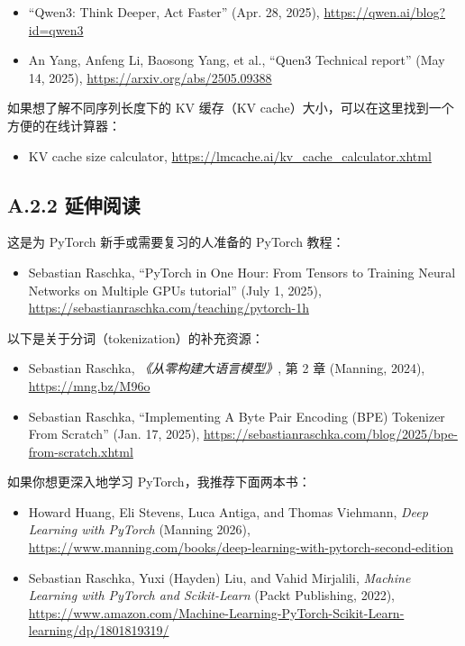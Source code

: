 \begin{itemize}
\item “Qwen3: Think Deeper, Act Faster” (Apr. 28, 2025), \href{https://qwen.ai/blog?id=qwen3}{https://qwen.ai/blog?id=qwen3}
\item An Yang, Anfeng Li, Baosong Yang, et al., “Quen3 Technical report” (May 14, 2025), \href{https://arxiv.org/abs/2505.09388}{https://arxiv.org/abs/2505.09388}
\end{itemize}

如果想了解不同序列长度下的 KV 缓存（KV cache）大小，可以在这里找到一个方便的在线计算器：

\begin{itemize}
\item KV cache size calculator, \href{https://lmcache.ai/kv\_cache\_calculator.xhtml}{https://lmcache.ai/kv\_cache\_calculator.xhtml}
\end{itemize}

\subsection{A.2.2 延伸阅读}

这是为 PyTorch 新手或需要复习的人准备的 PyTorch 教程：

\begin{itemize}
\item Sebastian Raschka, “PyTorch in One Hour: From Tensors to Training Neural Networks on Multiple GPUs tutorial” (July 1, 2025), \href{https://sebastianraschka.com/teaching/pytorch-1h}{https://sebastianraschka.com/teaching/pytorch-1h}
\end{itemize}

以下是关于分词（tokenization）的补充资源：

\begin{itemize}
\item Sebastian Raschka, \emph{《从零构建大语言模型》}, 第 2 章 (Manning, 2024), \href{https://mng.bz/M96o}{https://mng.bz/M96o}
\item Sebastian Raschka, “Implementing A Byte Pair Encoding (BPE) Tokenizer From Scratch” (Jan. 17, 2025), \href{https://sebastianraschka.com/blog/2025/bpe-from-scratch.xhtml}{https://sebastianraschka.com/blog/2025/bpe-from-scratch.xhtml}
\end{itemize}

如果你想更深入地学习 PyTorch，我推荐下面两本书：

\begin{itemize}
\item Howard Huang, Eli Stevens, Luca Antiga, and Thomas Viehmann, \emph{Deep Learning with PyTorch} (Manning 2026), \href{https://www.manning.com/books/deep-learning-with-pytorch-second-edition}{https://www.manning.com/books/deep-learning-with-pytorch-second-edition}
\item Sebastian Raschka, Yuxi (Hayden) Liu, and Vahid Mirjalili, \emph{Machine Learning with PyTorch and Scikit-Learn} (Packt Publishing, 2022), \href{https://www.amazon.com/Machine-Learning-PyTorch-Scikit-Learn-learning/dp/1801819319/}{https://www.amazon.com/Machine-Learning-PyTorch-Scikit-Learn-learning/dp/1801819319/}
\end{itemize}

